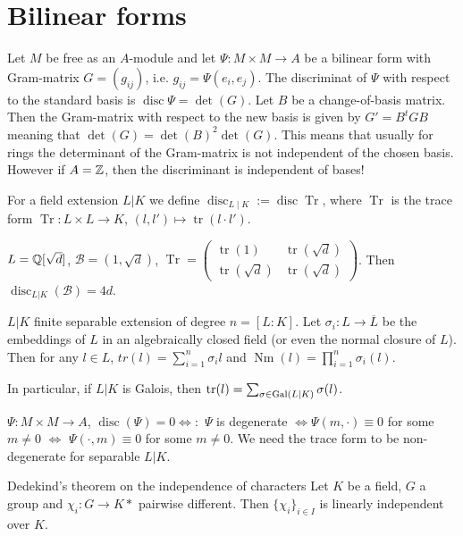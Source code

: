 \documentclass[12pt, a4paper]{article}
\DeclareMathOperator{\tr}{tr}
\DeclareMathOperator{\Tr}{Tr}
\DeclareMathOperator{\Nm}{Nm}
\DeclareMathOperator{\disc}{disc}
\begin{document}
\section{Bilinear forms}

Let $M$ be free as an $A$-module and let $\Psi: M \times M \to A$
be a bilinear form with Gram-matrix $G = (g_{ij})$, i.e. 
$g_{ij} = \Psi(e_i, e_j)$. The discriminat of $\Psi$ with respect 
to the standard basis is $\disc \Psi = \det(G)$.
Let $B$ be a change-of-basis matrix. Then the Gram-matrix 
with respect to the new basis is given by $G' = B^t G B$ meaning that
$\det(G) = \det(B)^2 \det(G)$. This means that usually for rings the 
determinant of the Gram-matrix is not independent of the chosen basis. 
However if $A = \mathbb{Z}$, then the discriminant is independent of bases!

For a field extension $L \vert K$ we define $\disc_{L\mid K} := \disc \Tr$, 
where $\Tr$ is the trace form $\Tr: L \times L \to K$, $(l, l') 
\mapsto \tr(l \cdot l')$.

\begin{ex}
	$L = \mathbb{Q}[\sqrt{d}]$, $\mathcal{B} = (1, \sqrt{d})$, $\Tr = 
	\begin{pmatrix}
		\tr(1) & \tr(\sqrt{d}) \\
		\tr(\sqrt{d}) & \tr(\sqrt{d})
	\end{pmatrix}$. Then $\disc_{L \vert K}(\mathcal{B}) = 4d$.
\end{ex}

\begin{prop}{}{}
	$L \vert K$ finite separable extension of degree $n = [L:K]$. Let 
	$\sigma_i: L \to \overline{L}$ be the embeddings of $L$ in an 
	algebraically closed field (or even the normal closure of $L$).
	Then for any $l \in L$, $tr(l) = \sum_{i=1}^{n} \sigma_i{l}$ and 
	$\Nm(l) = \prod_{i=1}^{n}\sigma_i(l)$.
\end{prop}

In particular, if $L \vert K$ is Galois, then $\tr(l) = \sum_{\sigma \in 
\Gal(L\vert K)} \sigma(l)$. 

$\Psi: M \times M \to A$, $\disc(\Psi) = 0 \iff:$ $\Psi$ is degenerate
	$\iff \Psi(m, \cdot) \equiv 0$ for some $m \neq 0$ $\iff$ $\Psi(\cdot, m) 
	\equiv 0$ for some $m \neq 0$. We need the trace form to be 
	non-degenerate for separable $L \vert K$.


	\begin{thm}{Dedekind's theorem on the independence of characters}{}
		Let $K$ be a field, $G$ a group and $\chi_i: G \to K*$ pairwise 
		different. Then $\{\chi_i\}_{i \in I} $ is linearly independent over $K$.
	\end{thm}
\end{document}
